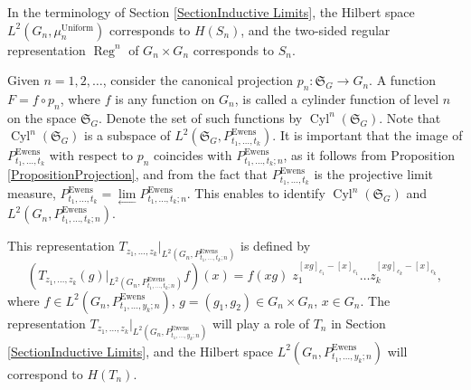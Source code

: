 \documentclass[12pt]{amsart}
\theoremstyle{definition}
\numberwithin{equation}{section}
\DeclareMathOperator{\Ewens}{Ewens}
\DeclareMathOperator{\Uniform}{Uniform}
\DeclareMathOperator{\Reg}{Reg}
\DeclareMathOperator{\Cyl}{Cyl}
\begin{document}
In the terminology of Section \ref{SectionInductive Limits}, the Hilbert space $L^2\left(G_n,\mu_n^{\Uniform}\right)$ corresponds to $H\left(S_n\right)$, and the two-sided regular representation $\Reg^n$ of $G_n\times G_n$ corresponds to $S_n$.

Given $n=1,2,\ldots$, consider the canonical projection
$p_n: \mathfrak{S}_{G}\longrightarrow G_n$. A function $F=f\circ p_n$, where $f$ is
any function on $G_n$, is called a cylinder function of level $n$ on the space $\mathfrak{S}_{G}$. Denote the set of such functions by $\Cyl^n\left(\mathfrak{S}_{G}\right)$. Note that $\Cyl^n\left(\mathfrak{S}_{G}\right)$ is a subspace of $L^2\left(\mathfrak{S}_G, P^{\Ewens}_{t_1,\ldots,t_k}\right)$.
It is important that the image of $P_{t_1,\ldots,t_k}^{\Ewens}$ with respect to $p_n$ coincides with $P_{t_1,\ldots,t_k;n}^{\Ewens}$, as it follows from Proposition \ref{PropositionProjection}, and from the fact that
$P_{t_1,\ldots,t_k}^{\Ewens}$ is the projective limit measure,
$P_{t_1,\ldots,t_k}^{\Ewens}
=\underset{\longleftarrow}{\lim}P_{t_1,\ldots,t_k;n}^{\Ewens}$. This enables to identify $\Cyl^n\left(\mathfrak{S}_{G}\right)$ and $L^2\left(G_n, P^{\Ewens}_{t_1,\ldots,t_k;n}\right)$.



















This representation $T_{z_1,\ldots,z_k}\biggl|_{L^2\left(G_n,P_{t_1,\ldots,t_k;n}^{\Ewens}\right)}$
is defined by
$$
\left(T_{z_1,\ldots,z_k}(g)\biggl|_{L^2\left(G_n,P_{t_1,\ldots,t_k;n}^{\Ewens}\right)}f\right)(x)=f(xg)\;z_1^{[xg]_{c_1}-[x]_{c_1}}\ldots z_k^{[xg]_{c_k}-[x]_{c_k}},
$$
where $f\in L^2\left(G_n,P_{t_1,\ldots,y_k;n}^{\Ewens}\right)$, $g=\left(g_1,g_2\right)\in G_n\times G_n$, $x\in G_n$. The representation
$T_{z_1,\ldots,z_k}\biggl|_{L^2\left(G_n,P_{t_1,\ldots,y_k;n}^{\Ewens}\right)}$ will play a role of $T_n$ in Section \ref{SectionInductive Limits}, and the Hilbert space
$L^2\left(G_n,P_{t_1,\ldots,y_k;n}^{\Ewens}\right)$ will correspond to $H\left(T_n\right)$.
\end{document}
